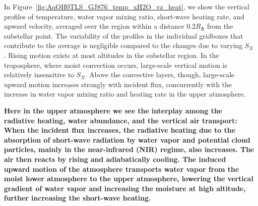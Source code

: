 \documentclass[11pt,numberedappendix,twocolappendix,]{emulateapj}
\def\wv{water vapor}
\def\revise#1{{\bf #1}}
\begin{document}
In Figure~\ref{fig:AqOH0TLS_GJ876_temp_xH2O_vz_heat}, we show the vertical profiles of temperature, \wv{} mixing ratio, short-wave heating rate, and upward velocity, averaged over the region within a distance $0.2R_\earth$ from the substellar point. 
The variability of the profiles in the individual gridboxes that contribute to the average is negligible compared to the changes due to varying $S_X$. 
%
Rising motion exists at most altitudes in the substellar region.  In the troposphere, where moist convection occurs, large-scale vertical motion is relatively insensitive to $S_X$.  Above the convective layers, though, large-scale upward motion increases strongly with incident flux, concurrently with the increase in \wv{} mixing ratio and heating rate in the upper atmosphere. 

\revise{Here in the upper atmosphere we see the interplay among the radiative heating, water abundance, and the vertical air transport:  
When the incident flux increases, the radiative heating due to the absorption of short-wave radiation by \wv{} \revise{and potential cloud particles}, mainly in the near-infrared (NIR) regime, also increases. %
The air then reacts by rising and adiabatically cooling. %
The induced upward motion of the atmosphere transports water vapor from the moist lower atmosphere to the upper atmosphere, lowering the vertical gradient of water vapor and increasing the moisture at high altitude, further increasing the short-wave \revise{heating}. }
\end{document}

